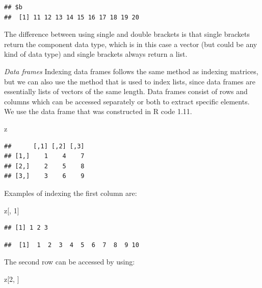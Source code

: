 \documentclass[]{book}
\newenvironment{Shaded}{\begin{snugshade}}{\end{snugshade}}
\newcommand{\DecValTok}[1]{\textcolor[rgb]{0.00,0.00,0.81}{#1}}
\newcommand{\OperatorTok}[1]{\textcolor[rgb]{0.81,0.36,0.00}{\textbf{#1}}}
\newcommand{\NormalTok}[1]{#1}
\begin{document}
\begin{verbatim}
## $b
##  [1] 11 12 13 14 15 16 17 18 19 20
\end{verbatim}

The difference between using single and double brackets is that single
brackets return the component data type, which is in this case a vector
(but could be any kind of data type) and single brackets always return a
list.

\emph{Data frames} Indexing data frames follows the same method as
indexing matrices, but we can also use the method that is used to index
lists, since data frames are essentially lists of vectors of the same
length. Data frames consist of rows and columns which can be accessed
separately or both to extract specific elements. We use the data frame
that was constructed in R code 1.11.

\begin{Shaded}
\begin{Highlighting}[]
\NormalTok{z}
\end{Highlighting}
\end{Shaded}

\begin{verbatim}
##      [,1] [,2] [,3]
## [1,]    1    4    7
## [2,]    2    5    8
## [3,]    3    6    9
\end{verbatim}

Examples of indexing the first column are:

\begin{Shaded}
\begin{Highlighting}[]
\NormalTok{z[, }\DecValTok{1}\NormalTok{]}
\end{Highlighting}
\end{Shaded}

\begin{verbatim}
## [1] 1 2 3
\end{verbatim}

\begin{Shaded}
\end{Shaded}

\begin{verbatim}
##  [1]  1  2  3  4  5  6  7  8  9 10
\end{verbatim}

The second row can be accessed by using:

\begin{Shaded}
\begin{Highlighting}[]
\NormalTok{z[}\DecValTok{2}\NormalTok{, ]}
\end{Highlighting}
\end{Shaded}
\end{document}
